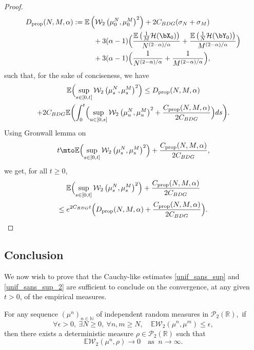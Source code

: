\begin{proof}
\begin{align*}
D_{\text{prop}}(N,M,\alpha)&:=\mathbb{E}\left(\mathcal{W}_2\left(\mu_0^N,\mu_0^M\right)^2\right)+2C_{BDG}(\sigma_N+\sigma_M)\\
&\hspace*{1cm}+3(\alpha-1)\Bigl(\frac{\mathbb{E}\left(\frac{1}{M}\mathcal{H}(\bX_0)\right)}{N^{(2-\alpha)/\alpha}}+\frac{\mathbb{E}\left(\frac{1}{N}\mathcal{H}(\bY_0)\right)}{M^{(2-\alpha)/\alpha}}\Bigr)\\
&\hspace*{1cm}+3(\alpha-1)\Bigl(\frac{1}{N^{(2-\alpha)/\alpha}}+\frac{1}{M^{(2-\alpha)/\alpha}}\Bigr),
\end{align*}
such that, for the sake of conciseness, we have
\begin{multline*}
\mathbb{E}\Bigl(\sup_{s\in[0,t]}\mathcal{W}_2\left(\mu_s^N,\mu_s^M\right)^2\Bigr)\leq D_{\text{prop}}(N,M,\alpha)\\
+2C_{BDG}\mathbb{E}\biggl(\int_0^t\Bigl(\sup_{u\in[0,s]}\mathcal{W}_2\left(\mu_u^N,\mu_u^M\right)^2+\frac{C_{\text{prop}}(N,M,\alpha)}{2C_{BDG}}\Bigr)ds\biggr).
\end{multline*}
Using Gronwall lemma on
\[
t\mto\mathbb{E}\Bigl(\sup_{s\in[0,t]}\mathcal{W}_2\left(\mu_s^N,\mu_s^M\right)^2\Bigr)+\frac{C_{\text{prop}}(N,M,\alpha)}{2C_{BDG}},
\]
we get, for all $t\geq0$,
\begin{multline*}
\mathbb{E}\Bigl(\sup_{s\in[0,t]}\mathcal{W}_2\left(\mu_s^N,\mu_s^M\right)^2\Bigr)+\frac{C_{\text{prop}}(N,M,\alpha)}{2C_{BDG}}\\
\leq e^{2C_{BDG}t}\Bigl(D_{\text{prop}}(N,M,\alpha)+\frac{C_{\text{prop}}(N,M,\alpha)}{2C_{BDG}}\Bigr).\qedhere
\end{multline*}
\end{proof}

\subsection{Conclusion}

We now wish to prove that the Cauchy-like estimates \eqref{unif_sans_sup} and \eqref{unif_sans_sup_2} are sufficient to conclude on the convergence, at any given $t>0$, of the empirical measures.

\begin{lemma}\label{conv_a_t_fixe}
For any sequence $(\mu^n)_{n\in\mathbb{N}}$ of independent random measures in $\mathcal{P}_2\left(\mathbb{R}\right)$,~if
\begin{equation}\label{Cauchy_seq_point}
\forall \epsilon>0,\ \exists N\geq0,\ \forall n,m\geq N,\quad \mathbb{E}\mathcal{W}_2\left(\mu^n,\mu^m\right)\leq\epsilon,
\end{equation}
then there exists a deterministic measure $\rho\in\mathcal{P}_2\left(\mathbb{R}\right)$ such that
\[
\mathbb{E}\mathcal{W}_2\left(\mu^n,\rho\right)\to 0\quad\text{as }\ n\to\infty.
\]
\end{lemma}

